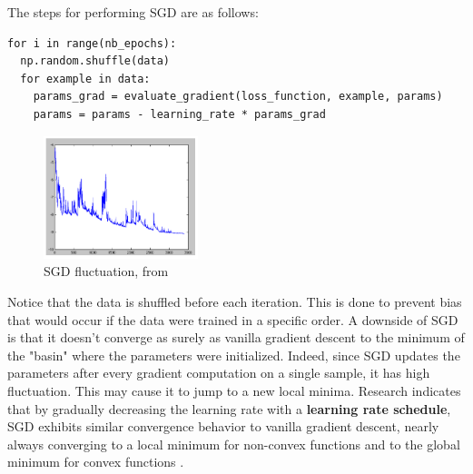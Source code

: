 \documentclass{article}
\begin{document}
   The steps for performing SGD are as follows:
\begin{verbatim}
for i in range(nb_epochs): 
  np.random.shuffle(data) 
  for example in data:
    params_grad = evaluate_gradient(loss_function, example, params) 
    params = params - learning_rate * params_grad
\end{verbatim}
\begin{figure} %
    \centering
    \label{fluctuation-SGD}
    \includegraphics[width=0.4\textwidth]{fluctuation-SGD}
    \caption{SGD fluctuation, from \citep{ruder2017overview}}
\end{figure}
Notice that the data is shuffled before each iteration. This is done to prevent bias that would occur if the data were trained in a specific order. A downside of SGD is that it doesn't converge as surely as vanilla gradient descent to the minimum of the "basin" where the parameters were initialized. Indeed, since SGD updates the parameters after every gradient computation on a single sample, it has high fluctuation. This may cause it to jump to a new local minima. Research indicates that by gradually decreasing the learning rate with a \textbf{learning rate schedule}, SGD exhibits similar convergence behavior to vanilla gradient descent, nearly always converging to a local minimum for non-convex functions and to the global minimum for convex functions \citep{ruder2017overview}.
\end{document}
